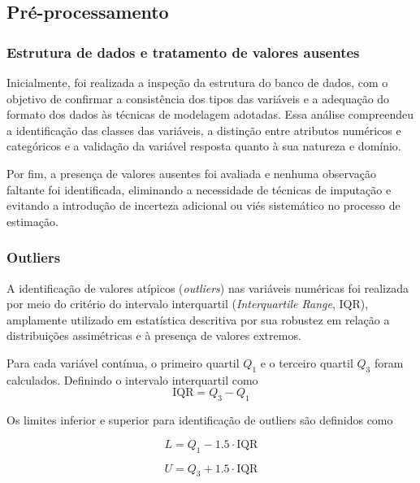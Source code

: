 \documentclass[
  brazilian,
  12pt,
  letterpaper,
  DIV=11,
  numbers=noendperiod]{scrartcl}
\begin{document}
\subsection{Pré-processamento}\label{pruxe9-processamento}

\subsubsection{Estrutura de dados e tratamento de valores
ausentes}\label{estrutura-de-dados-e-tratamento-de-valores-ausentes}

Inicialmente, foi realizada a inspeção da estrutura do banco de dados,
com o objetivo de confirmar a consistência dos tipos das variáveis e a
adequação do formato dos dados às técnicas de modelagem adotadas. Essa
análise compreendeu a identificação das classes das variáveis, a
distinção entre atributos numéricos e categóricos e a validação da
variável resposta quanto à sua natureza e domínio.

Por fim, a presença de valores ausentes foi avaliada e nenhuma
observação faltante foi identificada, eliminando a necessidade de
técnicas de imputação e evitando a introdução de incerteza adicional ou
viés sistemático no processo de estimação.

\subsubsection{Outliers}\label{outliers}

A identificação de valores atípicos (\emph{outliers}) nas variáveis
numéricas foi realizada por meio do critério do intervalo interquartil
(\emph{Interquartile Range}, IQR), amplamente utilizado em estatística
descritiva por sua robustez em relação a distribuições assimétricas e à
presença de valores extremos.

Para cada variável contínua, o primeiro quartil \(Q_1\) e o terceiro
quartil \(Q_3\) foram calculados. Definindo o intervalo interquartil
como
\begin{equation}
\mathrm{IQR} = Q_3 - Q_1
\label{eq:iqr}
\end{equation}

Os limites inferior e superior para identificação de outliers são
definidos como

\begin{equation}
L = Q_1 - 1.5 \cdot \mathrm{IQR}
\label{eq:lower_bound}
\end{equation}

\begin{equation}
U = Q_3 + 1.5 \cdot \mathrm{IQR}
\label{eq:upper_bound}
\end{equation}
\end{document}
